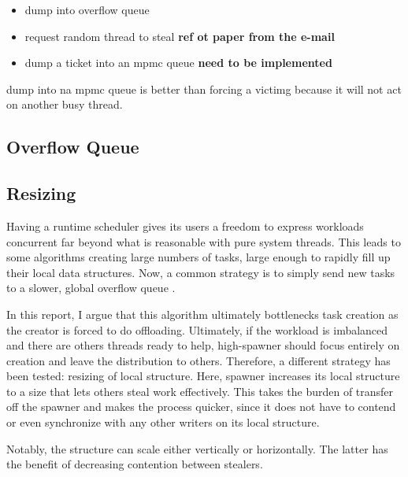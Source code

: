 \documentclass[12pt,a4paper,twoside]{report}
\begin{document}
\begin{itemize}
    \item dump into overflow queue 
    \item request random thread to steal \textbf{ref ot paper from the e-mail}
    \item dump a ticket into an mpmc queue \textbf{need to be implemented}
\end{itemize}

dump into na mpmc queue is better than forcing a victimg because it will not act on another busy thread. 




\subsection{Overflow Queue}
\label{section:design_overflow_queue}

\subsection{Resizing}
\label{section:resizing}
Having a runtime scheduler gives its users a freedom to express workloads concurrent far beyond what is reasonable with pure system threads. This leads to some algorithms creating large numbers of tasks, large enough to rapidly fill up their local data structures. Now, a common strategy is to simply send new tasks to a slower, global overflow queue .

In this report, I argue that this algorithm ultimately bottlenecks task creation as the creator is forced to do offloading. Ultimately, if the workload is imbalanced and there are others threads ready to help, high-spawner should focus entirely on creation and leave the distribution to others. Therefore, a different strategy has been tested: resizing of local structure. Here, spawner increases its local structure to a size that lets others steal work effectively. This takes the burden of transfer off the spawner and makes the process quicker, since it does not have to contend or even synchronize with any other writers on its local structure. 


Notably, the structure can scale either vertically or horizontally. The latter has the benefit of decreasing contention between stealers.  

\end{document}
